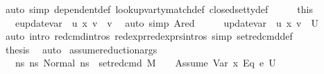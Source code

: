 \begin{isabellebody}
\ {\isacharparenleft}{\kern0pt}auto\ simp{\isacharcolon}{\kern0pt}\ dependent{\isacharunderscore}{\kern0pt}def\ lookup{\isacharunderscore}{\kern0pt}var{\isacharunderscore}{\kern0pt}ty{\isacharunderscore}{\kern0pt}match{\isacharunderscore}{\kern0pt}def\ closed{\isacharunderscore}{\kern0pt}set{\isacharunderscore}{\kern0pt}ty{\isacharunderscore}{\kern0pt}def{\isacharparenright}{\kern0pt}\isanewline
\ \ \isamarkupfalse%
\ \isamarkupfalse%
\ this\ \isamarkupfalse%
\ {\isachardoublequoteopen}{\isasymLambda}{\isacharcomma}{\kern0pt}{\isasymGamma}{\isacharcomma}{\kern0pt}{\isasymOmega}\ {\isasymturnstile}\ {\isasymlangle}e{}{\isacharcomma}{\kern0pt}update{\isacharunderscore}{\kern0pt}var\ {\isasymLambda}\ u\ x\ v{\isasymrangle}\ {\isasymDown}\ v{\isachardoublequoteclose}\ \isamarkupfalse%
\ {\isacharparenleft}{\kern0pt}auto\ simp{\isacharcolon}{\kern0pt}\ Ared{\isacharparenright}{\kern0pt}\isanewline
\ \ \isamarkupfalse%
\ \isamarkupfalse%
\ {\isachardoublequoteopen}update{\isacharunderscore}{\kern0pt}var\ {\isasymLambda}\ u\ x\ v\ {\isasymin}\ {\isacharquery}{\kern0pt}U{\isacharprime}{\kern0pt}{\isachardoublequoteclose}\isanewline
\ \ \ \ \isamarkupfalse%
\ {\isacharparenleft}{\kern0pt}auto\ intro{\isacharbang}{\kern0pt}{\isacharcolon}{\kern0pt}\ red{\isacharunderscore}{\kern0pt}cmd{\isachardot}{\kern0pt}intros\ red{\isacharunderscore}{\kern0pt}expr{\isacharunderscore}{\kern0pt}red{\isacharunderscore}{\kern0pt}exprs{\isachardot}{\kern0pt}intros\ simp{\isacharcolon}{\kern0pt}\ set{\isacharunderscore}{\kern0pt}red{\isacharunderscore}{\kern0pt}cmd{\isacharunderscore}{\kern0pt}def{\isacharparenright}{\kern0pt}\ \ \ \isanewline
\ \ \isamarkupfalse%
\ {\isacharquery}{\kern0pt}thesis\ \isamarkupfalse%
\ auto\isanewline
{}\isamarkupfalse%
%
\endisatagproof
{\isafoldproof}%
%
\isadelimproof
\isanewline
%
\endisadelimproof
\isanewline
{}\isamarkupfalse%
\ assume{\isacharunderscore}{\kern0pt}reduction{\isacharunderscore}{\kern0pt}args{\isacharcolon}{\kern0pt}\isanewline
\ \ \ {\isachardoublequoteopen}ns{\isacharprime}{\kern0pt}{\isasymin}\ {\isacharbraceleft}{\kern0pt}ns{\isacharprime}{\kern0pt}{\isachardot}{\kern0pt}\ Normal\ ns{\isacharprime}{\kern0pt}\ {\isasymin}\ {\isacharparenleft}{\kern0pt}set{\isacharunderscore}{\kern0pt}red{\isacharunderscore}{\kern0pt}cmd\ M\ {\isasymLambda}\ {\isasymGamma}\ {\isasymOmega}\ {\isacharparenleft}{\kern0pt}Assume\ {\isacharparenleft}{\kern0pt}{\isacharparenleft}{\kern0pt}Var\ x{\isacharparenright}{\kern0pt}\ {\isasymguillemotleft}Eq{\isasymguillemotright}\ e{}{\isacharparenright}{\kern0pt}{\isacharparenright}{\kern0pt}\ U{\isacharparenright}{\kern0pt}{\isacharbraceright}{\kern0pt}{\isachardoublequoteclose}\isanewline

\end{isabellebody}
